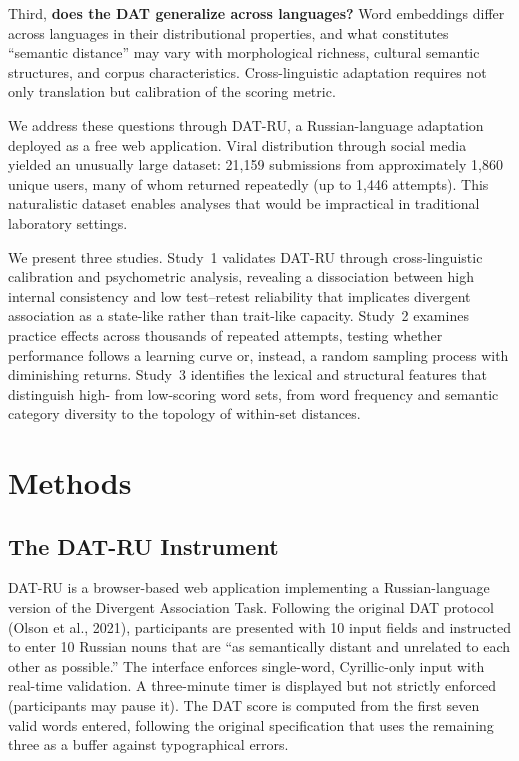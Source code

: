 \documentclass[12pt]{article}
\begin{document}
Third, \textbf{does the DAT generalize across languages?} Word embeddings differ across languages in their distributional properties, and what constitutes ``semantic distance'' may vary with morphological richness, cultural semantic structures, and corpus characteristics. Cross-linguistic adaptation requires not only translation but calibration of the scoring metric.

We address these questions through DAT-RU, a Russian-language adaptation deployed as a free web application. Viral distribution through social media yielded an unusually large dataset: 21,159 submissions from approximately 1,860 unique users, many of whom returned repeatedly (up to 1,446 attempts). This naturalistic dataset enables analyses that would be impractical in traditional laboratory settings.

We present three studies. Study~1 validates DAT-RU through cross-linguistic calibration and psychometric analysis, revealing a dissociation between high internal consistency and low test--retest reliability that implicates divergent association as a state-like rather than trait-like capacity. Study~2 examines practice effects across thousands of repeated attempts, testing whether performance follows a learning curve or, instead, a random sampling process with diminishing returns. Study~3 identifies the lexical and structural features that distinguish high- from low-scoring word sets, from word frequency and semantic category diversity to the topology of within-set distances.

\section{Methods}

\subsection{The DAT-RU Instrument}

DAT-RU is a browser-based web application implementing a Russian-language version of the Divergent Association Task. Following the original DAT protocol (Olson et al., 2021), participants are presented with 10 input fields and instructed to enter 10 Russian nouns that are ``as semantically distant and unrelated to each other as possible.'' The interface enforces single-word, Cyrillic-only input with real-time validation. A three-minute timer is displayed but not strictly enforced (participants may pause it). The DAT score is computed from the first seven valid words entered, following the original specification that uses the remaining three as a buffer against typographical errors.
\end{document}
